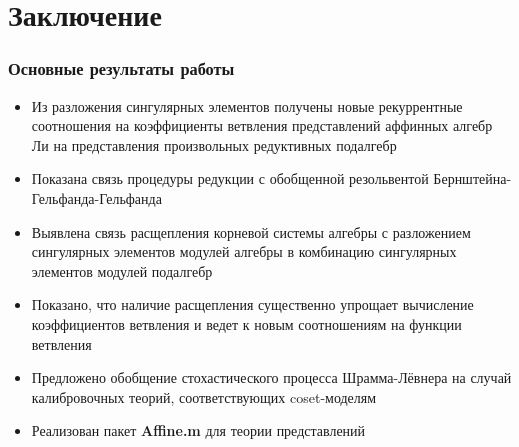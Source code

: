 \documentclass[pdftex]{beamer}
\theoremstyle{definition} \newtheorem{Def}{Определение}
\begin{document}
\section{Заключение}


\begin{frame}
  \frametitle{Основные результаты работы}
\begin{itemize}
\item Из разложения сингулярных элементов получены новые рекуррентные соотношения на коэффициенты ветвления представлений аффинных алгебр Ли на представления произвольных редуктивных подалгебр
\item Показана связь процедуры редукции с обобщенной резольвентой Бернштейна-Гельфанда-Гельфанда
\item Выявлена связь расщепления корневой системы алгебры с разложением сингулярных элементов модулей алгебры в комбинацию сингулярных элементов модулей подалгебр
\item Показано, что наличие расщепления существенно упрощает вычисление коэффициентов ветвления и ведет к новым соотношениям на функции ветвления
\item Предложено обобщение стохастического процесса Шрамма-Лёвнера на случай калибровочных теорий, соответствующих coset-моделям
\item Реализован пакет {\bf Affine.m} для теории представлений
\end{itemize}

\end{frame}
\end{document}
